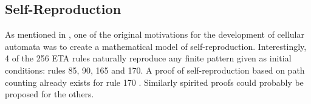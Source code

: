 \documentclass{article}
\begin{document}
\pagebreak
\subsection{Self-Reproduction} \label{self-reproduction}

As mentioned in \cite{saadatCopyMachinesSelfreproduction2023}, one of the original motivations for the development of cellular automata was to create a mathematical model of self-reproduction. Interestingly, 4 of the 256 ETA rules naturally reproduce any finite pattern given as initial conditions: rules 85, 90, 165 and 170. A proof of self-reproduction based on path counting already exists for rule 170 \cite{saadatCopyMachinesSelfreproduction2023}. Similarly spirited proofs could probably be proposed for the others.

\vspace{.6cm}
\end{document}
